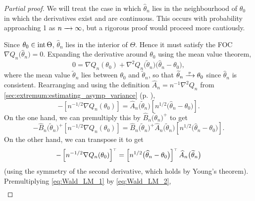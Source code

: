 \documentclass[11pt,letterpaper,reqno,oneside]{article}
\begin{document}
\begin{proof}[Partial proof]
	We will treat the case in which $\widehat{\theta}_n$ lies in the neighbourhood of $\theta_0$ in which the derivatives exist and are continuous. This occurs with probability approaching 1 as $n\xrightarrow{\;\;\;}\infty$, but a rigorous proof would proceed more cautiously.

	Since $\theta_0 \in \operatorname*{int} \Theta$, $\widehat{\theta}_n$ lies in the interior of $\Theta$. Hence it must satisfy the FOC $\nabla Q_n\bigl( \widehat{\theta}_n \bigr) = 0$. Expanding the derivative around $\theta_0$ using the mean value theorem,
	\begin{equation*}
		0 = \nabla Q_n( \theta_0 )
		+ \nabla^2 Q_n\bigl( \widetilde{\theta}_n \bigr) 
		\bigl( \widehat{\theta}_n - \theta_0 \bigr) ,
	\end{equation*}
	where the mean value $\widetilde{\theta}_n$ lies between $\theta_0$ and $\widetilde{\theta}_n$, so that $\widetilde{\theta}_n \xrightarrow{{\scriptscriptstyle \mathrm{\;p\;}}} \theta_0$ since $\widehat{\theta}_n$ is consistent. Rearranging and using the definition $\widehat{A}_n = n^{-1} \nabla^2 Q_n$ from \cref{sec:extremum:estimating_asymp_variance} (p. \pageref{sec:extremum:estimating_asymp_variance}),
	\begin{equation*}
		- \left[ n^{-1/2} \nabla Q_n( \theta_0 ) \right]
		= 
		\widehat{A}_n\bigl( \widetilde{\theta}_n \bigr)
		\left[ n^{1/2} \bigl( \widehat{\theta}_n - \theta_0 \bigr) \right] .
	\end{equation*}
	On the one hand, we can premultiply this by $\widehat{B}_n\bigl( \widetilde{\theta}_n \bigr)^+$ to get
	\begin{equation}
		- \widehat{B}_n\bigl( \widetilde{\theta}_n \bigr)^+ 
		\left[ n^{-1/2} \nabla Q_n( \theta_0 ) \right]
		= 
		\widehat{B}_n\bigl( \widetilde{\theta}_n \bigr)^+
		\widehat{A}_n\bigl( \widetilde{\theta}_n \bigr)
		\left[ n^{1/2} \bigl( \widehat{\theta}_n - \theta_0 \bigr) \right] .
		\label{eq:Wald_LM_1}
	\end{equation}
	On the other hand, we can transpose it to get
	\begin{equation}
		- \left[ n^{-1/2} \nabla Q_n( \theta_0 ) \right]^{\scriptscriptstyle \top}
		= 
		\left[ n^{1/2} \bigl( \widehat{\theta}_n - \theta_0 \bigr) \right]^{\scriptscriptstyle \top}
		\widehat{A}_n\bigl( \widetilde{\theta}_n \bigr)
		\label{eq:Wald_LM_2}
	\end{equation}
	(using the symmetry of the second derivative, which holds by Young's theorem). Premultiplying \eqref{eq:Wald_LM_1} by \eqref{eq:Wald_LM_2},
	\begin{multline*}

\end{multline*}
\end{proof}
\end{document}
